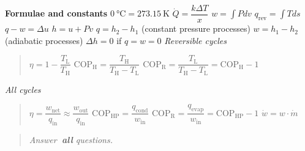 \documentclass[a4paper,12pt,fleqn]{article}
\begin{document}
\newpage
\textbf{Formulae and constants}
\newline\newline
$\SI{0}{\celsius}=\SI{273.15}{\kelvin}$
\newline\newline
$\dot Q =\dfrac{k\Delta T}{x}$
\newline\newline
$w=\int{Pdv}$
\newline\newline
$q_\mathrm{rev}=\int{Tds}$
\newline\newline
$q-w=\Delta u$
\newline\newline
$h=u+Pv$
\newline\newline
$q=h_2-h_1$ (constant pressure processes)
\newline\newline
$w=h_1-h_2$ (adiabatic processes)
\newline\newline
$\Delta h = 0$ if $q=w=0$
\newline\newline
\textit{Reversible cycles}\
\begin{quote}
\indent $\eta = 1 - \dfrac{T_\mathrm{L}}{T_\mathrm{H}}$ 
\newline\newline
\indent $\mathrm{COP_H}=\dfrac{T_\mathrm{H}}{T_\mathrm{H}-T_\mathrm{L}}$
\newline\newline
\indent $\mathrm{COP_R}=\dfrac{T_\mathrm{L}}{T_\mathrm{H}-T_\mathrm{L}}=\mathrm{COP_H}-1$
\newline
\end{quote}
\textit{All cycles}\
\begin{quote}
$\eta=\dfrac{w_\mathrm{net}}{q_\mathrm{in}}\approx\dfrac{w_\mathrm{out}}{q_\mathrm{in}}$
\newline\newline
$\mathrm{COP_{HP}}=\dfrac{q_\mathrm{cond}}{w_\mathrm{in}}$
\newline\newline
$\mathrm{COP_{R}}=\dfrac{q_\mathrm{evap}}{w_\mathrm{in}}=\mathrm{COP_{HP}}-1$
\newline\newline
$\dot w =w\cdot \dot m$
\end{quote}

\newpage
\begin{quote}
\begin{center}
\textit{Answer\textbf{\ all} questions.}
\end{center}
\end{quote}
\end{document}
